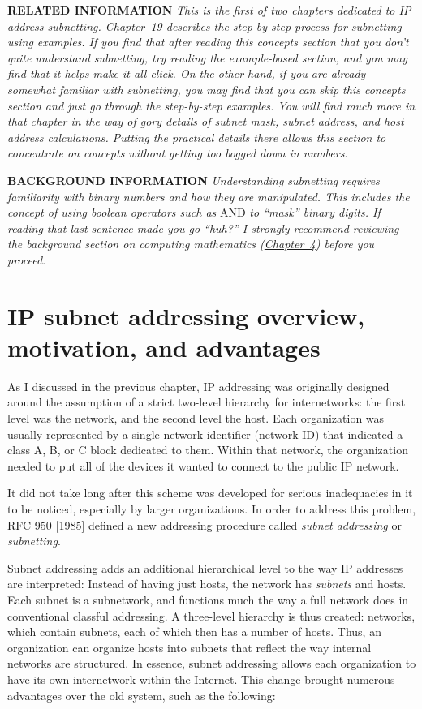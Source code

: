 {\textbf{RELATED INFORMATION}} {\emph{This is the first of two chapters
dedicated to IP address subnetting.
\protect\hyperlink{ch19.html}{Chapter~19} describes the step-by-step
process for subnetting using examples. If you find that after reading
this concepts section that you don't quite understand subnetting, try
reading the example-based section, and you may find that it helps make
it all click. On the other hand, if you are already somewhat familiar
with subnetting, you may find that you can skip this concepts section
and just go through the step-by-step examples. You will find much more
in that chapter in the way of gory details of subnet mask, subnet
address, and host address calculations. Putting the practical details
there allows this section to concentrate on concepts without getting too
bogged down in numbers}}.


{\textbf{BACKGROUND INFORMATION}} {\emph{Understanding subnetting
requires familiarity with binary numbers and how they are manipulated.
This includes the concept of using boolean operators such as}} AND
{\emph{to ``mask'' binary digits. If reading that last sentence made you
go ``huh?'' I strongly recommend reviewing the background section on
computing mathematics (\protect\hyperlink{ch04.html}{Chapter~4}) before
you proceed}}.




\section{IP subnet addressing overview, motivation, and advantages}

As I discussed in the previous chapter, IP addressing was originally
designed around the assumption of a strict two-level hierarchy for
internetworks: the first level was the network, and the second level the
host. Each organization was usually represented by a single network
identifier (network ID) that indicated a class A, B, or C block
dedicated to them. Within that network, the organization needed to put
all of the devices it wanted to connect to the public IP network.

It did not take long after this scheme was developed for serious
inadequacies in it to be noticed, especially by larger organizations. In
order to address this problem, RFC 950 {[}1985{]} defined a new
addressing procedure called {\emph{subnet addressing}} or
{\emph{subnetting}}.

Subnet addressing adds an additional hierarchical level to the way IP
addresses are interpreted: Instead of having just hosts, the network has
{\emph{subnets}} and hosts. Each subnet is a subnetwork, and functions
much the way a full network does in conventional classful addressing. A
three-level hierarchy is thus created: networks, which contain subnets,
each of which then has a number of hosts. Thus, an organization can
organize hosts into subnets that reflect the way internal networks are
structured. In essence, subnet addressing allows each organization to
have its own internetwork within the Internet. This change brought
numerous advantages over the old system, such as the following:

